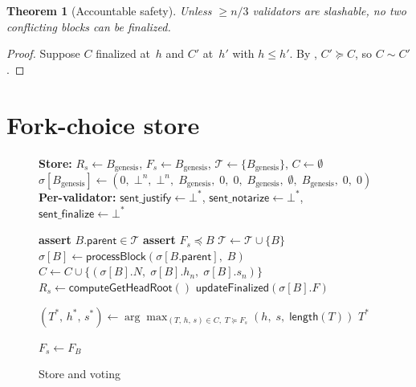 \ifx\litemode\undefined\documentclass{article}\fi
\newcommand{\parent}{\mathsf{parent}}
\newcommand{\sentfinalize}{\mathsf{sent\_finalize}}
\newcommand{\sentjustify}{\mathsf{sent\_justify}}
\newcommand{\sentnotarize}{\mathsf{sent\_notarize}}
\theoremstyle{plain}
\newtheorem{theorem}{Theorem}
\theoremstyle{definition}
\theoremstyle{remark}
\begin{document}
\begin{theorem}[Accountable safety]\label{thm:safety}
Unless $\geq n/3$ validators are slashable, no two conflicting blocks can be finalized.
\end{theorem}

\begin{proof}
Suppose $C$ finalized at~$h$ and $C'$ at~$h'$ with $h \leq h'$.
By , $C' \succeq C$, so $C \sim C'$.
\end{proof}

\section{Fork-choice store}

\begin{figure}[H]
\caption{Store and voting}\label{alg:store}
\begin{center}
\begin{boxedminipage}{\textwidth}
\begin{algorithmic}[1]

\State \textbf{Store:} $R_s \gets B_{\mathrm{genesis}}$, \; $F_s \gets B_{\mathrm{genesis}}$, \; $\mathcal{T} \gets \{B_{\mathrm{genesis}}\}$, \; $C \gets \emptyset$
\State $\sigma[B_{\mathrm{genesis}}] \gets (0,\; \bot^n,\; \bot^n,\; B_{\mathrm{genesis}},\; 0,\; 0,\; B_{\mathrm{genesis}},\; \emptyset,\; B_{\mathrm{genesis}},\; 0,\; 0)$
\State \textbf{Per-validator:} $\sentjustify \gets \bot^*$, \; $\sentnotarize \gets \bot^*$, \; $\sentfinalize \gets \bot^*$
\vspace{3pt}

  \State \textbf{assert} $B.\parent \in \mathcal{T}$ 
  \State \textbf{assert} $F_s \preceq B$ 
  \State $\mathcal{T} \gets \mathcal{T} \cup \{B\}$
  \State $\sigma[B] \gets \textsf{processBlock}(\sigma[B.\parent],\; B)$
  \State $C \gets C \cup \{(\sigma[B].N,\; \sigma[B].h_n,\; \sigma[B].s_n)\}$
  \State $R_s \gets \textsf{computeGetHeadRoot}()$
  \State $\textsf{updateFinalized}(\sigma[B].F)$
\EndFunction
\vspace{3pt}

  \State $(T^*,\, h^*,\, s^*) \gets \arg\max_{(T,\, h,\, s) \in C,\; T \succeq F_s} (h,\; s,\; \mathsf{length}(T))$
  \State \Return $T^*$
\EndFunction
\vspace{3pt}

    \State $F_s \gets F_B$
  \EndIf
\EndFunction
\vspace{3pt}


\end{algorithmic}
\end{boxedminipage}
\end{center}
\end{figure}
\end{document}
